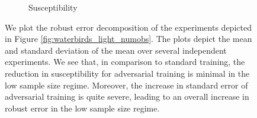 \begin{figure}[!t]
\begin{subfigure}[b]{0.32\textwidth}
  \caption{Susceptibility}
  \label{fig:app_waterbirds_susceptibility}
\end{subfigure}
\caption{We plot the robust error decomposition of the experiments depicted in Figure \ref{fig:waterbirds_light_numobs}. The plots depict the mean and standard deviation of the mean over several independent experiments. We see that, in comparison to standard training, the reduction in susceptibility for adversarial training is minimal in the low sample size regime. Moreover, the increase in standard error of adversarial training is quite severe, leading to an overall increase in robust error in the low sample size regime.}
\label{fig:light_numsamp_decomposition}
\end{figure}